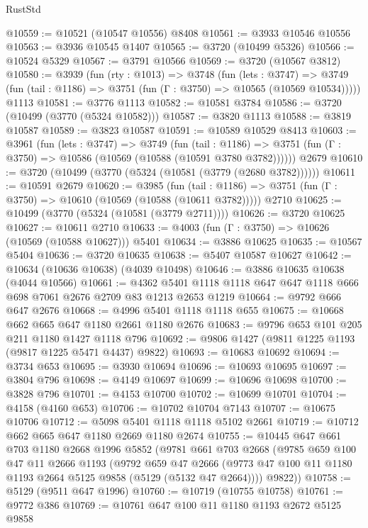 \begin{lexlean}{RustStd}
\begin{coremodule}
@10559 := @10521 (@10547 @10556) @8408
@10561 := @3933 @10546 @10556
@10563 := @3936 @10545 @1407
@10565 := @3720 (@10499 @5326)
@10566 := @10524 @5329
@10567 := @3791 @10566
@10569 := @3720 (@10567 @3812)
@10580 := @3939
    (fun (rty : @1013) =>
    @3748
      (fun (lets : @3747) =>
      @3749 (fun (tail : @1186) => @3751 (fun (Γ : @3750) => @10565 (@10569 @10534)))))
    @1113
@10581 := @3776 @1113
@10582 := @10581 @3784
@10586 := @3720 (@10499 (@3770 (@5324 @10582)))
@10587 := @3820 @1113
@10588 := @3819 @10587
@10589 := @3823 @10587
@10591 := @10589 @10529 @8413
@10603 := @3961
    (fun (lets : @3747) =>
    @3749
      (fun (tail : @1186) =>
      @3751 (fun (Γ : @3750) => @10586 (@10569 (@10588 (@10591 @3780 @3782))))))
    @2679
@10610 := @3720 (@10499 (@3770 (@5324 (@10581 (@3779 (@2680 @3782))))))
@10611 := @10591 @2679
@10620 := @3985
    (fun (tail : @1186) => @3751 (fun (Γ : @3750) => @10610 (@10569 (@10588 (@10611 @3782)))))
    @2710
@10625 := @10499 (@3770 (@5324 (@10581 (@3779 @2711))))
@10626 := @3720 @10625
@10627 := @10611 @2710
@10633 := @4003 (fun (Γ : @3750) => @10626 (@10569 (@10588 @10627))) @5401
@10634 := @3886 @10625
@10635 := @10567 @5404
@10636 := @3720 @10635
@10638 := @5407 @10587 @10627
@10642 := @10634 (@10636 @10638) (@4039 @10498)
@10646 := @3886 @10635 @10638 (@4044 @10566)
@10661 := @4362 @5401 @1118 @1118 @647 @647 @1118 @666 @698 @7061 @2676 @2709 @83 @1213 @2653 @1219
@10664 := @9792 @666 @647 @2676
@10668 := @4996 @5401 @1118 @1118 @655
@10675 := @10668 @662 @665 @647 @1180 @2661 @1180 @2676
@10683 := @9796 @653 @101 @205 @211 @1180 @1427 @1118 @796
@10692 := @9806 @1427 (@9811 @1225 @1193 (@9817 @1225 @5471 @4437) @9822)
@10693 := @10683 @10692
@10694 := @3734 @653
@10695 := @3930 @10694
@10696 := @10693 @10695
@10697 := @3804 @796
@10698 := @4149 @10697
@10699 := @10696 @10698
@10700 := @3828 @796
@10701 := @4153 @10700
@10702 := @10699 @10701
@10704 := @4158 (@4160 @653)
@10706 := @10702 @10704 @7143
@10707 := @10675 @10706
@10712 := @5098 @5401 @1118 @1118 @5102 @2661
@10719 := @10712 @662 @665 @647 @1180 @2669 @1180 @2674
@10755 := @10445
    @647
    @661
    @703
    @1180
    @2668
    @1996
    @5852
    (@9781
      @661
      @703
      @2668
      (@9785
        @659
        @100
        @47
        @11
        @2666
        @1193
        (@9792
          @659
          @47
          @2666
          (@9773 @47 @100 @11 @1180 @1193 @2664 @5125 @9858 (@5129 (@5132 @47 @2664))))
        @9822))
@10758 := @5129 (@9511 @647 @1996)
@10760 := @10719 (@10755 @10758)
@10761 := @9772 @386
@10769 := @10761 @647 @100 @11 @1180 @1193 @2672 @5125 @9858

\end{coremodule}
\end{lexlean}
